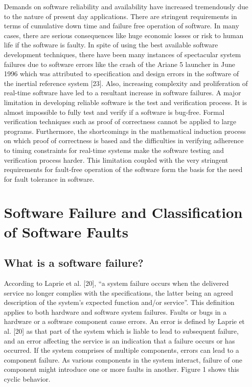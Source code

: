 \documentclass[oneside, a4paper, 11pt]{memoir}
\begin{document}
Demands on software reliability and availability have increased tremendously due to the nature of present day applications. There are stringent requirements in terms of cumulative down time and failure free operation of software. In many cases, there are serious consequences like huge economic losses or risk to human life if the software is faulty. In spite of using the best available software development techniques, there have been many instances of spectacular system failures due to software errors like the crash of the Ariane 5 launcher in June 1996 which was attributed to specification and design errors in the software of the inertial reference system [23]. Also, increasing complexity and proliferation of real-time software have led to a resultant increase in software failures. A major limitation in developing reliable software is the test and verification process. It is almost impossible to fully test and verify if a software is bug-free. Formal verification techniques such as proof of correctness cannot be applied to large programs. Furthermore, the shortcomings in the mathematical induction process on which proof of correctness is based and the difficulties in verifying adherence to timing constraints for real-time systems make the software testing and verification process harder. This limitation coupled with the very stringent requirements for fault-free operation of the software form the basis for the need for fault tolerance in software.

\section{Software Failure and Classification of Software Faults}
\subsection{What is a software failure?}
According to Laprie et al. [20], ``a system failure occurs when the delivered service no longer complies with the specifications, the latter being an agreed description of the system's expected function and/or service''. This definition applies to both hardware and software system failures. Faults or bugs in a hardware or a software component cause errors. An error is defined by Laprie et al. [20] as that part of the system which is liable to lead to subsequent failure, and an error affecting the service is an indication that a failure occurs or has occurred. If the system comprises of multiple components, errors can lead to a component failure. As various components in the system interact, failure of one component might introduce one or more faults in another. Figure 1 shows this cyclic behavior.
\end{document}
